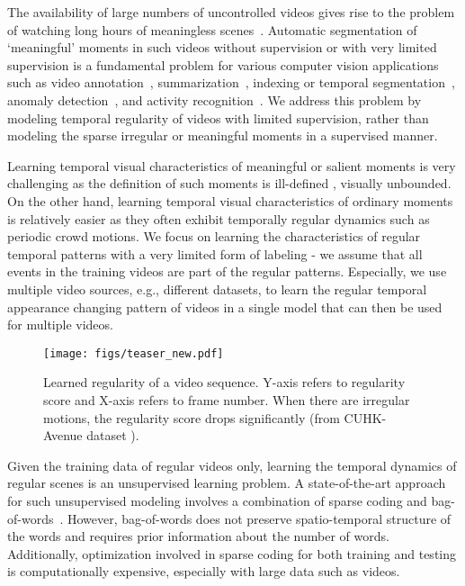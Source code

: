 \documentclass[10pt,twocolumn,letterpaper]{article}
\begin{document}
The availability of large numbers of uncontrolled videos gives rise to the problem of watching long hours of meaningless scenes~\cite{sunFS14}. 
Automatic segmentation of `meaningful' moments in such videos without supervision or with very limited supervision is a fundamental problem for various computer vision applications such as video annotation~\cite{vondrick2013efficiently}, summarization~\cite{songVSJ15,chuSJ15}, indexing or temporal segmentation~\cite{laptevMSR08}, anomaly detection~\cite{popoola2012video}, and activity recognition~\cite{karpathyTSLSF14}.
We address this problem by modeling temporal regularity of videos with limited supervision, rather than modeling the sparse irregular or meaningful moments in a supervised manner. 

Learning temporal visual characteristics of meaningful or salient moments is very challenging as the definition of such moments is ill-defined \ie, visually unbounded. 
On the other hand, learning temporal visual characteristics of ordinary moments is relatively easier as they often exhibit temporally regular dynamics such as periodic crowd motions.
We focus on learning the characteristics of regular temporal patterns with a very limited form of labeling - we assume that all events in the training videos are part of the regular patterns. 
Especially, we use multiple video sources, e.g., different datasets, to learn the regular temporal appearance changing pattern of videos in a single model that can then be used for multiple videos.



\begin{figure}[t]
	\centering
	\texttt{[image: figs/teaser\_new.pdf]}
\caption{Learned regularity of a video sequence. Y-axis refers to regularity score and X-axis refers to frame number. When there are irregular motions, the regularity score drops significantly (from CUHK-Avenue dataset \cite{lu2013abnormal}).}
	\vspace{-6mm}
	\label{fig:teaser_new}
\end{figure}







Given the training data of regular videos only, learning the temporal dynamics of regular scenes is an unsupervised learning problem. A state-of-the-art approach for such unsupervised modeling involves a combination of sparse coding and bag-of-words~\cite{zhao2011online,congYL11,lu2013abnormal}.
However, bag-of-words does not preserve spatio-temporal structure of the words and requires prior information about the number of words. Additionally, optimization involved in sparse coding for both training and testing is computationally expensive, especially with large data such as videos.
\end{document}
